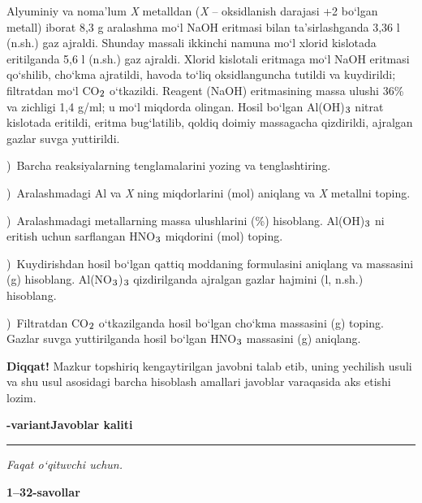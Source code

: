 \documentclass[11pt,a4paper]{article}
\renewcommand{\textsubscript}[1]{\ensuremath{_{\text{\fontsize{8}{8}\selectfont #1}}}}
\newcommand{\qsep}{\par\vspace{13pt}}
\newcommand{\diqqat}[1]{\par\smallskip\noindent\textbf{Diqqat!} #1\par\medskip}
\begin{document}
Alyuminiy va noma'lum \textit{X} metalldan (\textit{X} -- oksidlanish darajasi +2 bo`lgan metall) iborat 8,3 g aralashma mo`l NaOH eritmasi bilan ta'sirlashganda 3,36 l (n.sh.) gaz ajraldi. Shunday massali ikkinchi namuna mo`l xlorid kislotada eritilganda 5,6 l (n.sh.) gaz ajraldi. Xlorid kislotali eritmaga mo`l NaOH eritmasi qo`shilib, cho`kma ajratildi, havoda to`liq oksidlanguncha tutildi va kuydirildi; filtratdan mo`l CO\textsubscript{2} o`tkazildi. Reagent (NaOH) eritmasining massa ulushi 36\% va zichligi 1,4 g/ml; u mo`l miqdorda olingan. Hosil bo`lgan Al(OH)\textsubscript{3} nitrat kislotada eritildi, eritma bug`latilib, qoldiq doimiy massagacha qizdirildi, ajralgan gazlar suvga yuttirildi.\par
{})\ Barcha reaksiyalarning tenglamalarini yozing va tenglashtiring.\par
{})\ Aralashmadagi Al va \textit{X} ning miqdorlarini (mol) aniqlang va \textit{X} metallni toping.\par
{})\ Aralashmadagi metallarning massa ulushlarini (\%) hisoblang. Al(OH)\textsubscript{3} ni eritish uchun sarflangan HNO\textsubscript{3} miqdorini (mol) toping.\par
{})\ Kuydirishdan hosil bo`lgan qattiq moddaning formulasini aniqlang va massasini (g) hisoblang. Al(NO\textsubscript{3})\textsubscript{3} qizdirilganda ajralgan gazlar hajmini (l, n.sh.) hisoblang.\par
{})\ Filtratdan CO\textsubscript{2} o`tkazilganda hosil bo`lgan cho`kma massasini (g) toping. Gazlar suvga yuttirilganda hosil bo`lgan HNO\textsubscript{3} massasini (g) aniqlang.\par
\diqqat{Mazkur topshiriq kengaytirilgan javobni talab etib, uning yechilish usuli va shu usul asosidagi barcha hisoblash amallari javoblar varaqasida aks etishi lozim.}\qsep
\newpage
\noindent\textbf{\fontsize{13}{15}-variant}\hfill \textbf{Javoblar kaliti}\par\smallskip\hrule\smallskip
\textit{Faqat o`qituvchi uchun.}\par\medskip
\noindent\textbf{1--32-savollar}\par\smallskip
\end{document}
